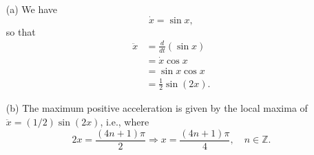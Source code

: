 
\begin{itemize}
    \item[(a)] We have
        \[
            \dot{x} = \sin{x},
        \]
        so that
        \begin{equation*}
            \begin{split}
                \ddot{x} &= \frac{d}{dt}(\sin{x}) \\
                         &= \dot{x}\cos{x} \\
                         &= \sin{x}\cos{x} \\
                         &= \frac{1}{2}\sin{(2x)}.
            \end{split}
        \end{equation*}
    \item[(b)] The maximum positive acceleration is given by the local maxima of
        $\ddot{x} = (1/2)\sin{(2x)}$, i.e., where 
        \[
            2x = \frac{(4n + 1)\pi}{2} \Rightarrow x = \frac{(4n + 1)\pi}{4},
            \quad n \in \mathbb{Z}.
        \]
\end{itemize}
